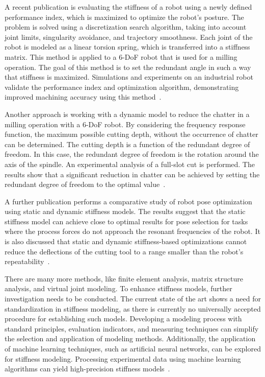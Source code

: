 A recent publication is evaluating the stiffness of a robot using a newly defined performance index, which is maximized to optimize the robot's posture. The problem is solved using a discretization search algorithm, taking into account joint limits, singularity avoidance, and trajectory smoothness. 
Each joint of the robot is modeled as a linear torsion spring, which is transferred into a stiffness matrix. This method is applied to a 6-DoF robot that is used for a milling operation. The goal of this method is to set the redundant angle in such a way that stiffness is maximized. Simulations and experiments on an industrial robot validate the performance index and optimization algorithm, demonstrating improved machining accuracy using this method~\cite{Xiong.2019}.


Another approach is working with a dynamic model to reduce the chatter in a milling operation with a 6-DoF robot. By considering the frequency response function, the maximum possible cutting depth, without the occurrence of chatter can be determined. The cutting depth is a function of the redundant degree of freedom. In this case, the redundant degree of freedom is the rotation around the axis of the spindle. An experimental analysis of a full-slot cut is performed. The results show that a significant reduction in chatter can be achieved by setting the redundant degree of freedom to the optimal value~\cite{Wang.2022}.

A further publication performs a comparative study of robot pose optimization using static and dynamic stiffness models. The results suggest that the static stiffness model can achieve close to optimal results for pose selection for tasks where the process forces do not approach the resonant frequencies of the robot. It is also discussed that static and dynamic stiffness-based optimizations cannot reduce the deflections of the cutting tool to a range smaller than the robot's repeatability~\cite{Cvitanic.2020}.

There are many more methods, like finite element analysis, matrix structure analysis, and virtual joint modeling. 
To enhance stiffness models, further investigation needs to be conducted. The current state of the art shows a need for standardization in stiffness modeling, as there is currently no universally accepted procedure for establishing such models. Developing a modeling process with standard principles, evaluation indicators, and measuring techniques can simplify the selection and application of modeling methods. Additionally, the application of machine learning techniques, such as artificial neural networks, can be explored for stiffness modeling. Processing experimental data using machine learning algorithms can yield high-precision stiffness models~\cite{Wu.2022}.

